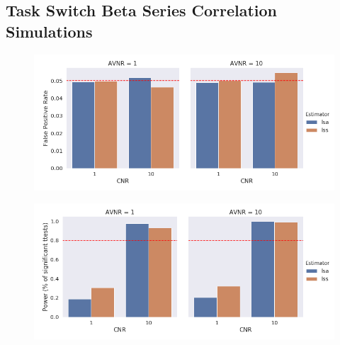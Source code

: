 \documentclass[10pt,letterpaper]{article}
\begin{document}


\subsection*{Task Switch Beta Series Correlation Simulations}


\begin{figure}[H]
  \centering
    \includegraphics[width=\textwidth]{taskswitch-switchXrepeat_fpr}
  \label{fig:task_fpr}
\end{figure}

\begin{figure}[H]
  \centering
  \includegraphics[width=\textwidth]{taskswitch-switchXrepeat_smalldiff}
  \label{fig:task_smalldiff}
\end{figure}
\end{document}
